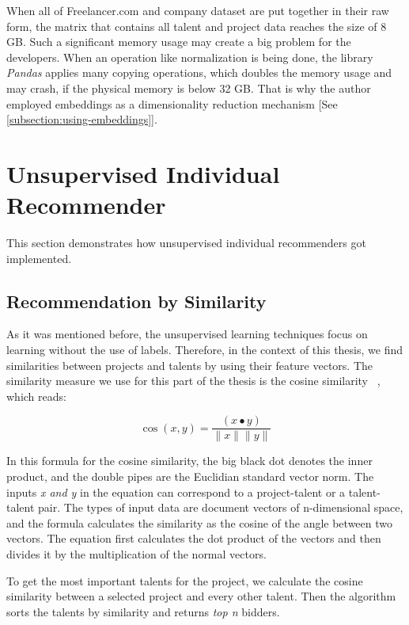 When all of Freelancer.com and company dataset are put together in their raw form, the matrix that contains all talent and project data reaches the size of 8 GB. Such a significant memory usage may create a big problem for the developers. When an operation like normalization is being done, the library \textit{Pandas} applies many copying operations, which doubles the memory usage and may crash, if the physical memory is below 32 GB. That is why the author employed embeddings as a dimensionality reduction mechanism [See \ref{subsection:using-embeddings}].




\section{Unsupervised Individual Recommender}\label{implementation-unsupervised-individual}

This section demonstrates how unsupervised individual recommenders got implemented.

\subsection{Recommendation by Similarity}\label{implementation-unsupervised-similarity}

As it was mentioned before, the unsupervised learning techniques focus on learning without the use of labels. Therefore, in the context of this thesis, we find similarities between projects and talents by using their feature vectors. The similarity measure we use for this part of the thesis is the cosine similarity ~\parencite{amatriain2011data}, which reads:



\begin{equation}
\cos (x, y)=\frac{(x \bullet y)}{\|x\|\|y\|}
\end{equation}


In this formula for the cosine similarity, the big black dot denotes the inner product, and the double pipes are the Euclidian standard vector norm. The inputs  \textit{x and y} in the equation can correspond to a project-talent or a talent-talent pair. The types of input data are document vectors of n-dimensional space, and the formula calculates the similarity as the cosine of the angle between two vectors. The equation first calculates the dot product of the vectors and then divides it by the multiplication of the normal vectors.


To get the most important talents for the project, we calculate the cosine similarity between a selected project and every other talent. Then the algorithm sorts the talents by similarity and returns \textit{top n} bidders.



